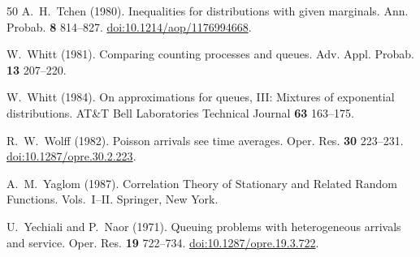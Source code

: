 \documentclass[11pt,reqno]{amsart}
\numberwithin{equation}{section}
\theoremstyle{plain}
\theoremstyle{definition}
\newcommand{\1}{\mathbf 1}
\begin{document}
\begin{thebibliography}{50}
A.~H.~Tchen (1980).
Inequalities for distributions with given marginals.
Ann. Probab. \textbf{8} 814--827.
\href{https://doi.org/10.1214/aop/1176994668}{doi:10.1214/aop/1176994668}.

W.~Whitt (1981).
Comparing counting processes and queues.
Adv. Appl. Probab. \textbf{13} 207--220.

W.~Whitt (1984).
On approximations for queues, III: Mixtures of exponential distributions.
AT\&T Bell Laboratories Technical Journal \textbf{63} 163--175.

R.~W.~Wolff (1982).
Poisson arrivals see time averages.
Oper. Res. \textbf{30} 223--231.
\href{https://doi.org/10.1287/opre.30.2.223}{doi:10.1287/opre.30.2.223}.

A.~M.~Yaglom (1987).
Correlation Theory of Stationary and Related Random Functions. Vols.~I--II.
Springer, New York.

U.~Yechiali and P.~Naor (1971).
Queuing problems with heterogeneous arrivals and service.
Oper. Res. \textbf{19} 722--734.
\href{https://doi.org/10.1287/opre.19.3.722}{doi:10.1287/opre.19.3.722}.
\end{thebibliography}
\end{document}
